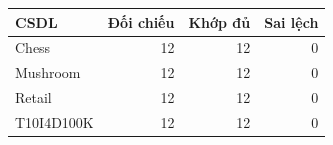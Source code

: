 \begin{tabular}{lrrr}
\toprule
CSDL & Đối chiếu & Khớp đủ & Sai lệch \\
\midrule
Chess & 12 & 12 & 0 \\
Mushroom & 12 & 12 & 0 \\
Retail & 12 & 12 & 0 \\
T10I4D100K & 12 & 12 & 0 \\
\bottomrule
\end{tabular}
